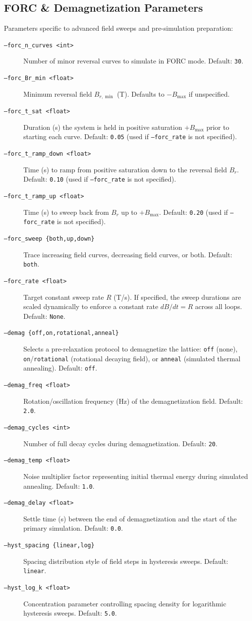 \documentclass[11pt,a4paper]{article}
\newcommand{\code}[1]{\texttt{#1}}
\begin{document}
\subsection{FORC \& Demagnetization Parameters}
Parameters specific to advanced field sweeps and pre-simulation preparation:
\begin{description}
    \item[\code{--forc\_n\_curves <int>}] Number of minor reversal curves to simulate in FORC mode. Default: \code{30}.
    \item[\code{--forc\_Br\_min <float>}] Minimum reversal field $B_{r,\min}$ (\si{T}). Defaults to $-B_{\max}$ if unspecified.
    \item[\code{--forc\_t\_sat <float>}] Duration (\si{s}) the system is held in positive saturation $+B_{\max}$ prior to starting each curve. Default: \code{0.05} (used if \code{--forc\_rate} is not specified).
    \item[\code{--forc\_t\_ramp\_down <float>}] Time (\si{s}) to ramp from positive saturation down to the reversal field $B_r$. Default: \code{0.10} (used if \code{--forc\_rate} is not specified).
    \item[\code{--forc\_t\_ramp\_up <float>}] Time (\si{s}) to sweep back from $B_r$ up to $+B_{\max}$. Default: \code{0.20} (used if \code{--forc\_rate} is not specified).
    \item[\code{--forc\_sweep \{both,up,down\}}] Trace increasing field curves, decreasing field curves, or both. Default: \code{both}.
    \item[\code{--forc\_rate <float>}] Target constant sweep rate $R$ (\si{T/s}). If specified, the sweep durations are scaled dynamically to enforce a constant rate $dB/dt = R$ across all loops. Default: \code{None}.
    \item[\code{--demag \{off,on,rotational,anneal\}}] Selects a pre-relaxation protocol to demagnetize the lattice: \code{off} (none), \code{on}/\code{rotational} (rotational decaying field), or \code{anneal} (simulated thermal annealing). Default: \code{off}.
    \item[\code{--demag\_freq <float>}] Rotation/oscillation frequency (\si{Hz}) of the demagnetization field. Default: \code{2.0}.
    \item[\code{--demag\_cycles <int>}] Number of full decay cycles during demagnetization. Default: \code{20}.
    \item[\code{--demag\_temp <float>}] Noise multiplier factor representing initial thermal energy during simulated annealing. Default: \code{1.0}.
    \item[\code{--demag\_delay <float>}] Settle time (\si{s}) between the end of demagnetization and the start of the primary simulation. Default: \code{0.0}.
    \item[\code{--hyst\_spacing \{linear,log\}}] Spacing distribution style of field steps in hysteresis sweeps. Default: \code{linear}.
    \item[\code{--hyst\_log\_k <float>}] Concentration parameter controlling spacing density for logarithmic hysteresis sweeps. Default: \code{5.0}.
\end{description}
\end{document}
